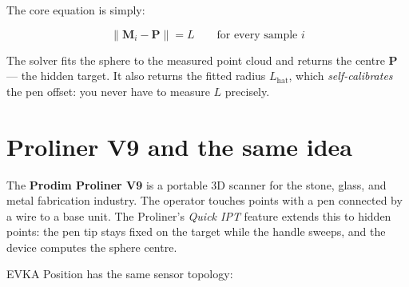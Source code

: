 \documentclass[11pt,a4paper]{article}
\begin{document}
The core equation is simply:

\begin{equation}
  \|\mathbf{M}_i - \mathbf{P}\| = L \qquad \text{for every sample } i
\end{equation}

The solver fits the sphere to the measured point cloud and returns the centre
$\mathbf{P}$ --- the hidden target.  It also returns the fitted radius
$L_{\text{hat}}$, which \emph{self-calibrates} the pen offset: you never have to
measure $L$ precisely.

\section{Proliner V9 and the same idea}

The \textbf{Prodim Proliner V9} is a portable 3D scanner for the stone, glass,
and metal fabrication industry.  The operator touches points with a pen
connected by a wire to a base unit.  The Proliner's \emph{Quick IPT} feature
extends this to hidden points: the pen tip stays fixed on the target while the
handle sweeps, and the device computes the sphere centre.

EVKA Position has the same sensor topology:

\begin{center}
\end{center}
\end{document}
